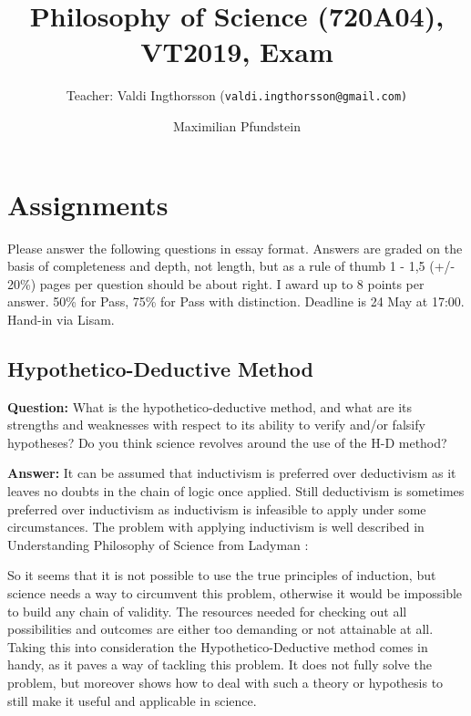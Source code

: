 \documentclass[11pt]{scrartcl}
\title{Philosophy of Science (720A04), VT2019, Exam}
\subtitle{Teacher: Valdi Ingthorsson (\texttt{valdi.ingthorsson@gmail.com)}}
\author{Maximilian Pfundstein}
\begin{document}
\maketitle

\tableofcontents

\newpage

\section{Assignments}

Please answer the following questions in essay format. Answers are graded on the basis of completeness and depth, not length, but as a rule of thumb 1 - 1,5 (+/- 20\%) pages per question should be about right. I award up to 8 points per answer. 50\% for Pass, 75\% for Pass with distinction. Deadline is 24 May at 17:00. Hand-in via Lisam.

\subsection{Hypothetico-Deductive Method}

\textbf{Question:} What is the hypothetico-deductive method, and what are its strengths and weaknesses with respect to its ability to verify and/or falsify hypotheses? Do you think science revolves around the use of the H-D method?

\bigbreak

\textbf{Answer:} It can be assumed that inductivism is preferred over deductivism as it leaves no doubts in the chain of logic once applied. Still deductivism is sometimes preferred over inductivism as inductivism is infeasible to apply under some circumstances. The problem with applying inductivism is well described in Understanding Philosophy of Science from Ladyman \cite[p. 40]{ladyman}: 

So it seems that it is not possible to use the true principles of induction, but science needs a way to circumvent this problem, otherwise it would be impossible to build any chain of validity. The resources needed for checking out all possibilities and outcomes are either too demanding or not attainable at all. Taking this into consideration the Hypothetico-Deductive method comes in handy, as it paves a way of tackling this problem. It does not fully solve the problem, but moreover shows how to deal with such a theory or hypothesis to still make it useful and applicable in science.
\end{document}
